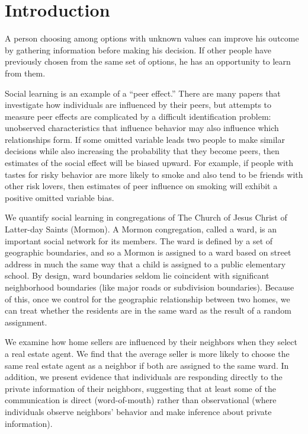 \documentclass[12pt]{article}
\begin{document}
\section*{Introduction}
    A person choosing among options with unknown values can improve his outcome by gathering information before making his decision.
    If other people have previously chosen from the same set of options, he has an opportunity to learn from them.

    Social learning is an example of a ``peer effect.'' There are many papers that investigate how individuals are influenced by their peers, but 
    attempts to measure peer effects are complicated by a difficult identification problem: unobserved characteristics that influence behavior may
    also influence which relationships form. If some omitted variable leads two people to make similar decisions while also increasing the probability
    that they become peers, then estimates of the social effect will be biased upward. For example, if people with tastes for risky behavior are more
    likely to smoke and also tend to be friends with other risk lovers, then estimates of peer influence on smoking will exhibit a positive omitted
    variable bias.

    We quantify social learning in congregations of The Church of Jesus Christ of Latter-day Saints (Mormon). A Mormon congregation, called a ward, is
    an important social network for its members. The ward is defined by a set of geographic boundaries, and so a Mormon is assigned to a ward based on
    street address in much the same way that a child is assigned to a public elementary school. By design, ward boundaries seldom lie coincident
    with significant neighborhood boundaries (like major roads or subdivision boundaries). Because of this, once we control for the geographic
    relationship between two homes, we can treat whether the residents are in the same ward as the result of a random assignment.

    We examine how home sellers are influenced by their neighbors when they select a real estate agent. We find that the average seller is more
    likely to choose the same real estate agent as a neighbor if both are assigned to the same ward. In addition, we present evidence that individuals
    are responding directly to the private information of their neighbors, suggesting that at least some of the communication is direct
    (word-of-mouth) rather than observational (where individuals observe neighbors' behavior and make inference about private information).
\end{document}
